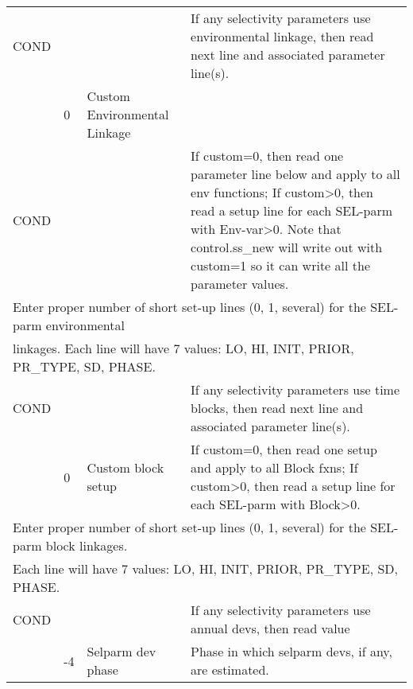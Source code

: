 \begin{center}
\begin{longtable}{p{2cm} p{1cm} p{4cm} p{8cm}}
			COND &  & & If any selectivity parameters use environmental linkage, then read next line and associated parameter line(s).\\
			     & 0 & Custom Environmental Linkage	& \\
			\hline
			COND &  & & If custom=0, then read one parameter line below and apply to all env functions;
			If custom>0, then read a setup line for each SEL-parm with Env-var>0. Note that control.ss\_new will write out with custom=1 so it can write all the parameter values.\\
			\hline
			\multicolumn{4}{l}{Enter proper number of short set-up lines (0, 1, several) for the SEL-parm environmental}\\
			\multicolumn{4}{l}{linkages.  Each line will have 7 values:  LO, HI, INIT, PRIOR, PR\_TYPE, SD, PHASE.}\\
			\hline
			COND & & & If any selectivity parameters use time blocks, then read next line and associated parameter line(s). \\
			     & 0 & Custom block setup & If custom=0, then read one setup and apply to all Block fxns;
			     If custom>0, then read a setup line for each SEL-parm with Block>0.  \\
			\hline
			\multicolumn{4}{l}{Enter proper number of short set-up lines (0, 1, several) for the SEL-parm block linkages.}\\
			\multicolumn{4}{l}{Each line will have 7 values:  LO, HI, INIT, PRIOR, PR\_TYPE, SD, PHASE.} \\
			\hline
			COND &  & & If any selectivity parameters use annual devs, then read  value\\
			     & -4 & Selparm dev phase & Phase in which selparm devs, if any, are estimated. \\
			\hline
	\end{longtable}
\end{center}

